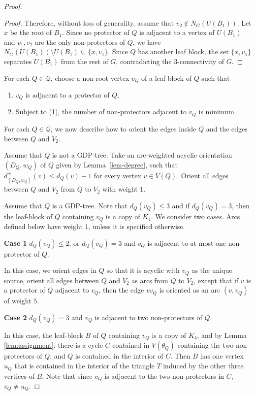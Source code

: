 \documentclass[11pt,a4paper]{article}
\theoremstyle{definition}
\begin{document}
\begin{proof}
\begin{proof}
Therefore, without loss of generality, assume that $v_2\notin N_G(U(B_1))$.
Let $x$ be the root of $B_1$. Since no protector of $Q$ is adjacent to a vertex of $U(B_1)$ and $v_1,v_2$ are the only non-protectors of $Q$, we have
$N_G(U(B_1))\setminus U(B_1)\subseteq\{x,v_1\}$. Since $Q$ has another leaf block, the set $\{x,v_1\}$ separates
$U(B_1)$ from the rest of $G$, contradicting the $3$-connectivity
of $G$.
\end{proof}

For each $Q \in \mathcal{Q}$, choose a non-root vertex $v_Q$ of a leaf block of $Q$ such that 
\begin{enumerate}
    \item $v_Q$ is adjacent to a protector of $Q$.
    \item Subject to (1), the number of non-protectors adjacent to $v_Q$ is minimum.
\end{enumerate}

For each $Q\in\mathcal Q$, we now describe how to orient the edges
inside $Q$ and the edges between $Q$ and $V_2$. 

Assume that  $Q$ is not a GDP-tree. Take an arc-weighted acyclic orientation $(D_Q,w_Q)$ of $Q$ given by Lemma~\ref{lem-degree}, such that
$d^+_{(D_Q,w_Q)}(v)\le d_Q(v)-1$ for every vertex $v\in V(Q)$.
Orient all edges between $Q$ and $V_2$ from $Q$ to $V_2$ with
weight $1$.

Assume that  $Q$ is a GDP-tree. Note that $d_Q(v_Q) \le 3$ and if $d_Q(v_Q)=3$, then the leaf-block of $Q$ containing $v_Q$ is a copy of $K_4$. We consider two cases. Arcs defined below have weight 1, unless it is specified otherwise.

\medskip
\noindent
{\bf Case 1} $d_Q(v_Q) \le 2$, or $d_Q(v_Q)=3$ and $v_Q$ is adjacent to at most one non-protector of $Q$.

In this case, we orient edges in $Q$ so that it is acyclic with $v_Q$ as the unique source, orient all edges between $Q$ and $V_2$ as arcs from $Q$ to $V_2$, except that if $v$ is a protector of $Q$ adjacent to $v_Q$, then the edge $vv_Q$ is oriented as an arc $(v, v_Q)$ of weight $5$.

\medskip
\noindent
{\bf Case 2}  $d_Q(v_Q)=3$ and $v_Q$ is adjacent to two non-protectors of $Q$.

In this case,  the leaf-block $B$ of $Q$ containing $v_Q$ is a copy of $K_4$, and by Lemma \ref{lem:assignment}, there is a cycle $C$ contained in $V(\theta_Q)$ containing the two non-protectors of $Q$, and $Q$ is contained in the interior of $C$. Then $B$ has one vertex $u_Q$ that is  contained in the interior of the triangle $T$ induced by the other three vertices of $B$. Note that since $v_Q$ is adjacent to the two non-protectors in $C$, $v_Q \ne u_Q$.


\end{proof}
\end{document}
